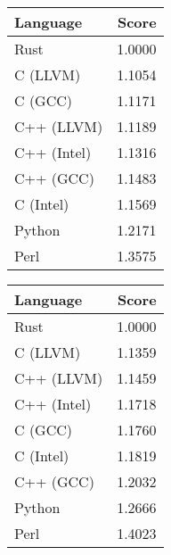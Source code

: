 \begin{subtable}{0.33\textwidth}
    \centering
    \caption{$k=1$}
    \label{table:energy:dfa_gap(1)}
    \begin{tabular}{|l|r|}
        \hline
        Language & Score \\
        \hline
        Rust & 1.0000 \\
        C (LLVM) & 1.1054 \\
        C (GCC) & 1.1171 \\
        C++ (LLVM) & 1.1189 \\
        C++ (Intel) & 1.1316 \\
        C++ (GCC) & 1.1483 \\
        C (Intel) & 1.1569 \\
        Python & 1.2171 \\
        Perl & 1.3575 \\
        \hline
    \end{tabular}
\end{subtable}%
\begin{subtable}{0.33\textwidth}
    \centering
    \caption{$k=2$}
    \label{table:energy:dfa_gap(2)}
    \begin{tabular}{|l|r|}
        \hline
        Language & Score \\
        \hline
        Rust & 1.0000 \\
        C (LLVM) & 1.1359 \\
        C++ (LLVM) & 1.1459 \\
        C++ (Intel) & 1.1718 \\
        C (GCC) & 1.1760 \\
        C (Intel) & 1.1819 \\
        C++ (GCC) & 1.2032 \\
        Python & 1.2666 \\
        Perl & 1.4023 \\
        \hline
    \end{tabular}
\end{subtable}%
